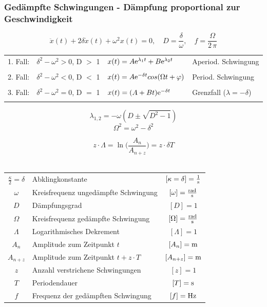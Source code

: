 \subsubsection{Gedämpfte Schwingungen - Dämpfung proportional zur Geschwindigkeit}
$$ \boxed{\ddot{x}(t) + 2\delta \dot{x}(t) + \omega^2x(t) = 0, \quad D = \frac{\delta}{\omega}, \quad f = \frac{\Omega}{2 \, \pi}} $$
\tiny
\setlength{\tabcolsep}{3pt}
\begin{tabular}{|l|c|l|l|}\hline
        1. Fall: & $\delta^2 - \omega^2 > 0$, D $>$ 1 & $ x(t) = A \mathrm{e}^{\lambda_1t} + B\mathrm{e}^{\lambda_2t} $ & Aperiod. Schwingung \\ 
        & & & \\ \hline
        2. Fall: & $\delta^2 - \omega^2 < 0$, D $<$ 1 & $ x(t) = A \mathrm{e}^{-\delta t} cos(\Omega t + \varphi) $ & Period. Schwingung \\
        & & & \\\hline
        3. Fall: & $\delta^2 - \omega^2 = 0$, D $=$ 1 & $ x(t) = (A + Bt)\mathrm{e}^{-\delta t} $ & Grenzfall ($\lambda = -\delta$) \\
        & & & \\\hline
\end{tabular}
\normalsize



\begin{minipage}{0.5\linewidth}
    $$ \boxed{ \lambda_{1,2} = -\omega ( D \pm \sqrt{D^2 -1}) }$$ 
    $$ \boxed{ \Omega^2 =  \omega^2 - \delta^2 }$$ 
\end{minipage}
\hfill
\begin{minipage}{0.45\linewidth}
    $$ \boxed{ z \cdot \Lambda = \ln \Big( \frac{A_n}{A_{n+z}} \Big) = z \cdot \delta T }$$ \\
\end{minipage}

\begin{tabular}{c l c}
$\frac{\kappa}{2} = \delta$ & Abklingkonstante & $[\kappa = \delta] = \frac{1}{\mathrm{s}}$ \\
$\omega$ & Kreisfrequenz ungedämpfte Schwingung & $[\omega] = \frac{\mathrm{rad}}{\mathrm{s}}$ \\
$D$ & Dämpfungsgrad & $[D] = 1$ \\
$\Omega$ & Kreisfrequenz gedämpfte Schwingung & $[\Omega] = \frac{\mathrm{rad}}{\mathrm{s}}$ \\


$\Lambda$ & Logarithmisches Dekrement & $[\Lambda] = 1$ \\
$A_n$ & Amplitude zum Zeitpunkt $t$ & $[A_n] = \mathrm{m}$ \\
$A_{n+z}$ & Amplitude zum Zeitpunkt $t + z \cdot T$ & $[A_{n+z}] = \mathrm{m}$ \\
$z$ & Anzahl verstrichene Schwingungen & $[z] = 1$ \\
$T$ & Periodendauer & $[T] = \mathrm{s}$ \\
$f$ & Frequenz der gedämpften Schwingung & $[f] = \mathrm{Hz}$ 
\end{tabular}


